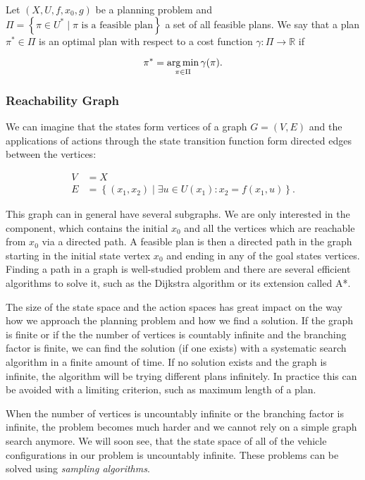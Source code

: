 \begin{defn}
	Let $\left(X, U, f, x_0, g\right)$ be a planning problem and $\Pi=\left\{\pi\in U^* \mid \pi \text{ is a feasible plan}\right\}$ a set of all feasible plans. We say that a plan $\pi^*\in \Pi$ is an optimal plan with respect to a cost function $\gamma: \Pi \rightarrow \mathbb{R}$ if
	
	\[
		\pi^*=\operatorname*{arg\,min}_{\pi\in\Pi} \gamma(\pi).
	\]
\end{defn}

\subsubsection{Reachability Graph}

We can imagine that the states form vertices of a graph $G=(V, E)$ and the applications of actions through the state transition function form directed edges between the vertices:

\begin{equation*}
\begin{aligned}
	V&=X \\
	E&=\left\{(x_1, x_2) \mid \exists u \in U(x_1): x_2 = f(x_1, u) \right\}.
\end{aligned}
\end{equation*}

This graph can in general have several subgraphs. We are only interested in the component, which contains the initial $x_0$ and all the vertices which are reachable from $x_0$ via a directed path. A feasible plan is then a directed path in the graph starting in the initial state vertex $x_0$ and ending in any of the goal states vertices. Finding a path in a graph is well-studied problem and there are several efficient algorithms to solve it, such as the Dijkstra algorithm or its extension called A*.

The size of the state space and the action spaces has great impact on the way how we approach the planning problem and how we find a solution. If the graph is finite or if the the number of vertices is countably infinite and the branching factor is finite, we can find the solution (if one exists) with a systematic search algorithm in a finite amount of time. If no solution exists and the graph is infinite, the algorithm will be trying different plans infinitely. In practice this can be avoided with a limiting criterion, such as maximum length of a plan.

When the number of vertices is uncountably infinite or the branching factor is infinite, the problem becomes much harder and we cannot rely on a simple graph search anymore. We will soon see, that the state space of all of the vehicle configurations in our problem is uncountably infinite. These problems can be solved using \textit{sampling algorithms}.

